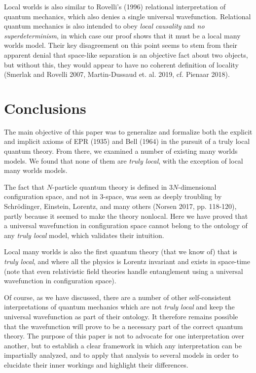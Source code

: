 \documentclass[a4paper]{article}
\begin{document}
 Local worlds is also similar to Rovelli's (1996) relational interpretation of quantum mechanics, which also denies a single universal wavefunction.  Relational quantum mechanics is also intended to obey \textit{local causality} and \textit{no superdeterminism}, in which case our proof shows that it must be a local many worlds model. Their key disagreement on this point seems to stem from their apparent denial that space-like separation is an objective fact about two objects, but without this, they would appear to have no coherent definition of locality (Smerlak and Rovelli 2007, Martin-Dussaud et. al. 2019, cf. Pienaar 2018).

\section{Conclusions}  \label{sec:Conc}
The main objective of this paper was to generalize and formalize both the explicit and implicit axioms of EPR (1935) and Bell (1964) in the pursuit of a truly local quantum theory. From there, we examined a number of existing many worlds models. We found that none of them are \textit{truly local}, with the exception of local many worlds models.

The fact that $N$-particle quantum theory is defined in $3N$-dimensional configuration space, and not in 3-space, was seen as deeply troubling by Schr\"{o}dinger, Einstein, Lorentz, and many others (Norsen 2017, pp. 118-120), partly because it seemed to make the theory nonlocal.  Here we have proved that a universal wavefunction in configuration space cannot belong to the ontology of any \textit{truly local} model, which validates their intuition.
  
Local many worlds is also the first quantum theory (that we know of) that is \textit{truly local}, and where all the physics is Lorentz invariant and exists in space-time (note that even relativistic field theories handle entanglement using a universal wavefunction in configuration space).

Of course, as we have discussed, there are a number of other self-consistent interpretations of quantum mechanics which are not \textit{truly local} and keep the universal wavefunction as part of their ontology. It therefore remains possible that the wavefunction will prove to be a necessary part of the correct quantum theory.  The purpose of this paper is not to advocate for one interpretation over another, but to establish a clear framework in which any interpretation can be impartially analyzed, and to apply that analysis to several models in order to elucidate their inner workings and highlight their differences.\newline
\end{document}
